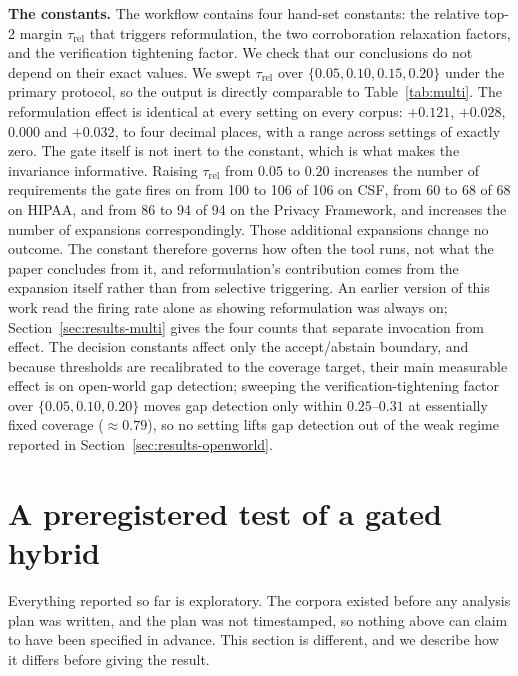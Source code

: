 \documentclass[smallextended,natbib]{svjour3}
\begin{document}
\noindent\textbf{The constants.}
The workflow contains four hand-set constants: the relative top-2 margin $\tau_{\text{rel}}$ that triggers reformulation, the two corroboration relaxation factors, and the verification tightening factor.
We check that our conclusions do not depend on their exact values.
We swept $\tau_{\text{rel}}$ over $\{0.05, 0.10, 0.15, 0.20\}$ under the primary protocol, so the output is directly comparable to Table~\ref{tab:multi}. The reformulation effect is identical at every setting on every corpus: $+0.121$, $+0.028$, $0.000$ and $+0.032$, to four decimal places, with a range across settings of exactly zero.
The gate itself is not inert to the constant, which is what makes the invariance informative. Raising $\tau_{\text{rel}}$ from $0.05$ to $0.20$ increases the number of requirements the gate fires on from 100 to 106 of 106 on CSF, from 60 to 68 of 68 on HIPAA, and from 86 to 94 of 94 on the Privacy Framework, and increases the number of expansions correspondingly. Those additional expansions change no outcome. The constant therefore governs how often the tool runs, not what the paper concludes from it, and reformulation's contribution comes from the expansion itself rather than from selective triggering.
An earlier version of this work read the firing rate alone as showing reformulation was always on; Section~\ref{sec:results-multi} gives the four counts that separate invocation from effect.
The decision constants affect only the accept/abstain boundary, and because thresholds are recalibrated to the coverage target, their main measurable effect is on open-world gap detection; sweeping the verification-tightening factor over $\{0.05, 0.10, 0.20\}$ moves gap detection only within $0.25$--$0.31$ at essentially fixed coverage ($\approx 0.79$), so no setting lifts gap detection out of the weak regime reported in Section~\ref{sec:results-openworld}.


\section{A preregistered test of a gated hybrid}
\label{sec:hybrid}

Everything reported so far is exploratory. The corpora existed before any analysis plan was written, and the plan was not timestamped, so nothing above can claim to have been specified in advance. This section is different, and we describe how it differs before giving the result.
\end{document}
